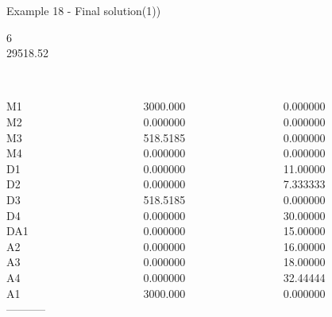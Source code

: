 \begin{frame}{Example 18 - Final solution(1))}

 6 \\
  29518.52\\

\begin{columns}[t]
\begin{column}{0.3\textwidth}
\\
M1\\
M2\\
M3\\
M4\\
D1\\
D2\\
D3\\
D4\\
DA1\\
A2\\
A3\\
A4\\
A1\\
-----------\\

\end{column}
\begin{column}{0.3\textwidth}
\\
3000.000\\
0.000000\\
518.5185\\
0.000000\\
0.000000\\
0.000000\\
518.5185\\
0.000000\\
0.000000\\
0.000000\\
0.000000\\
0.000000\\
3000.000\\
\end{column}  

\begin{column}{0.3\textwidth}
\\
0.000000\\
0.000000\\
0.000000\\
0.000000\\
11.00000\\
7.333333\\
0.000000\\
30.00000\\
15.00000\\
16.00000\\
18.00000\\
32.44444\\
0.000000\\
\end{column}
\end{columns}
\end{frame}

